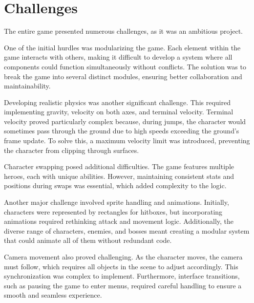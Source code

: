 \section{Challenges}  
The entire game presented numerous challenges, as it was an ambitious project.  

One of the initial hurdles was modularizing the game. Each element within the game interacts with others, making it difficult to develop a system where all components could function simultaneously without conflicts. The solution was to break the game into several distinct modules, ensuring better collaboration and maintainability.  

Developing realistic physics was another significant challenge. This required implementing gravity, velocity on both axes, and terminal velocity. Terminal velocity proved particularly complex because, during jumps, the character would sometimes pass through the ground due to high speeds exceeding the ground’s frame update. To solve this, a maximum velocity limit was introduced, preventing the character from clipping through surfaces.  

Character swapping posed additional difficulties. The game features multiple heroes, each with unique abilities. However, maintaining consistent stats and positions during swaps was essential, which added complexity to the logic.  

Another major challenge involved sprite handling and animations. Initially, characters were represented by rectangles for hitboxes, but incorporating animations required rethinking attack and movement logic. Additionally, the diverse range of characters, enemies, and bosses meant creating a modular system that could animate all of them without redundant code.  

Camera movement also proved challenging. As the character moves, the camera must follow, which requires all objects in the scene to adjust accordingly. This synchronization was complex to implement. Furthermore, interface transitions, such as pausing the game to enter menus, required careful handling to ensure a smooth and seamless experience.  
